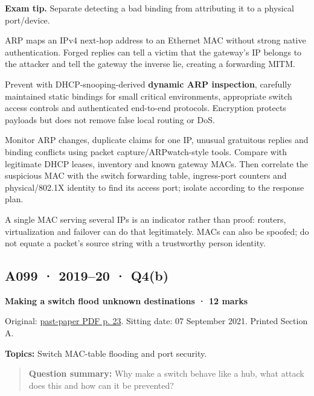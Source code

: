 \documentclass[11pt,a4paper]{article}
\begin{document}
{\color{ForestGreen}\textbf{Exam tip.} Separate detecting a bad binding from attributing it to a physical port/\allowbreak{}device.}


ARP maps an IPv4 next-hop address to an Ethernet MAC without strong native authentication. Forged replies can tell a victim that the gateway's IP belongs to the attacker and tell the gateway the inverse lie,\allowbreak{} creating a forwarding MITM.


Prevent with DHCP-snooping-derived \textbf{dynamic ARP inspection},\allowbreak{} carefully maintained static bindings for small critical environments,\allowbreak{} appropriate switch access controls and authenticated end-to-end protocols. Encryption protects payloads but does not remove false local routing or DoS.


Monitor ARP changes,\allowbreak{} duplicate claims for one IP,\allowbreak{} unusual gratuitous replies and binding conflicts using packet capture/\allowbreak{}ARPwatch-style tools. Compare with legitimate DHCP leases,\allowbreak{} inventory and known gateway MACs. Then correlate the suspicious MAC with the switch forwarding table,\allowbreak{} ingress-port counters and physical/\allowbreak{}802.1X identity to find its access port; isolate according to the response plan.


A single MAC serving several IPs is an indicator rather than proof: routers,\allowbreak{} virtualization and failover can do that legitimately. MACs can also be spoofed; do not equate a packet's source string with a trustworthy person identity.




\clearpage
\subsection{A099 · 2019–20 · Q4(b)}\label{a099}

\textbf{Making a switch flood unknown destinations · 12 marks}


Original: \href{../../CSE405-Security_Merged.pdf\#page=23}{past-paper PDF p. 23}. Sitting date: 07 September 2021. Printed Section A.


\textbf{Topics:} Switch MAC-table flooding and port security.



\begin{quote}\small

\textbf{Question summary:} Why make a switch behave like a hub,\allowbreak{} what attack does this and how can it be prevented?



\end{quote}
\end{document}
